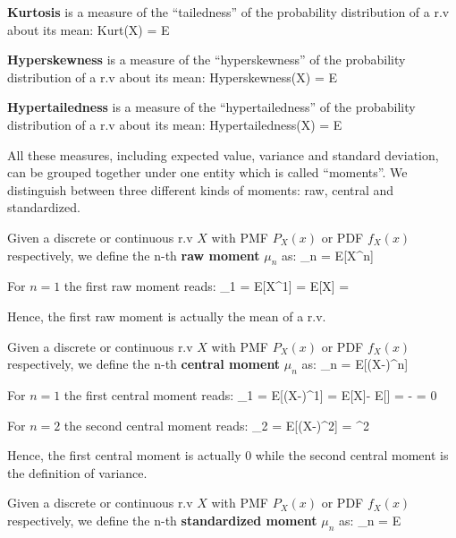 
\vspace{10pt}

\bd[Kurtosis]
\textbf{Kurtosis} is a measure of the ``tailedness'' of the probability distribution of a r.v about its mean:
\bse
Kurt(X) = E 
\ese
\ed

\vspace{10pt}


\vspace{5pt}

\bd[Hyperskewness]
\textbf{Hyperskewness} is a measure of the ``hyperskewness'' of the probability distribution of a r.v about its mean:
\bse
Hyperskewness(X) = E 
\ese
\ed

\bd[Hypertailedness]
\textbf{Hypertailedness} is a measure of the ``hypertailedness'' of the probability distribution of a r.v about its
mean:
\bse
Hypertailedness(X) = E 
\ese
\ed

All these measures, including expected value, variance and standard deviation, can be grouped together under one
entity which is called ``moments''. We distinguish between three different kinds of moments: raw, central and
standardized.

Given a discrete or continuous r.v $X$ with PMF $P_{X}(x)$ or PDF $f_{X}(x)$ respectively, we define the n-th
\textbf{raw moment} $\mu_n$ as:
\bse
\mu_n = E[X^n]
\ese
\ed

For $n=1$ the first raw moment reads:
\bse
\mu_1 = E[X^1] = E[X] = \mu
\ese

Hence, the first raw moment is actually the mean of a r.v.

Given a discrete or continuous r.v $X$ with PMF $P_{X}(x)$ or PDF $f_{X}(x)$ respectively, we define the n-th
\textbf{central moment} $\mu_n$ as:
\bse
\mu_n = E[(X-\mu)^n]
\ese
\ed

For $n=1$ the first central moment reads:
\bse
\mu_1 = E[(X-\mu)^1] = E[X]- E[\mu] = \mu - \mu = 0
\ese

For $n=2$ the second central moment reads:
\bse
\mu_2 = E[(X-\mu)^2] = \sigma^2
\ese

Hence, the first central moment is actually 0 while the second central moment is the definition of variance.

Given a discrete or continuous r.v $X$ with PMF $P_{X}(x)$ or PDF $f_{X}(x)$ respectively, we define the n-th
\textbf{standardized moment} $\mu_n$ as:
\bse
\mu_n = E 
\ese
\ed

